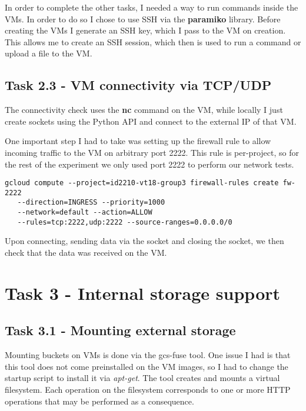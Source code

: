 \documentclass[paper=a4, fontsize=11pt]{scrartcl}
\numberwithin{equation}{section}    %
\numberwithin{figure}{section}      %
\numberwithin{table}{section}       %
\begin{document}
In order to complete the other tasks, I needed a way to run commands inside the VMs. In order to do so I chose to use SSH via the \textbf{paramiko} library. Before creating the VMs I generate an SSH key, which I pass to the VM on creation.
This allows me to create an SSH session, which then is used to run a command or upload a file to the VM.

\subsection{Task 2.3 - VM connectivity via TCP/UDP}

The connectivity check uses the \textbf{nc} command on the VM, while locally I just create sockets using the Python API and connect to the external IP of that VM.

One important step I had to take was setting up the firewall rule to allow incoming traffic to the VM on arbitrary port 2222. This rule is per-project, so for the rest of the experiment we only used port 2222 to perform our network tests.

\begin{verbatim}
gcloud compute --project=id2210-vt18-group3 firewall-rules create fw-2222
   --direction=INGRESS --priority=1000
   --network=default --action=ALLOW
   --rules=tcp:2222,udp:2222 --source-ranges=0.0.0.0/0
\end{verbatim}

Upon connecting, sending data via the socket and closing the socket, we then check that the data was received on the VM. 

\section{Task 3 - Internal storage support}

\subsection{Task 3.1 - Mounting external storage}

Mounting buckets on VMs is done via the gcs-fuse tool. One issue I had is that this tool does not come preinstalled on the VM images, so I had to change the startup script to install it via \textit{apt-get}.
The tool creates and mounts a virtual filesystem. Each operation on the filesystem corresponds to one or more HTTP operations that may be performed as a consequence.
\end{document}
